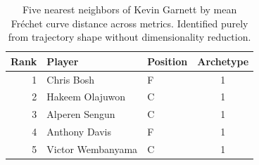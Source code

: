 \begin{table}[htbp]
  \centering\small
  \begin{tabular}{rllc}
    \toprule
    Rank & Player & Position & Archetype \\
    \midrule
    1 & Chris Bosh & F & 1 \\
    2 & Hakeem Olajuwon & C & 1 \\
    3 & Alperen Sengun & C & 1 \\
    4 & Anthony Davis & F & 1 \\
    5 & Victor Wembanyama & C & 1 \\
    \bottomrule
  \end{tabular}
  \caption{Five nearest neighbors of Kevin Garnett by mean Fr\'{e}chet curve distance across metrics. Identified purely from trajectory shape without dimensionality reduction.}
  \label{tab:Kevin_Garnett_frechet_curve_neighbors}
\end{table}

